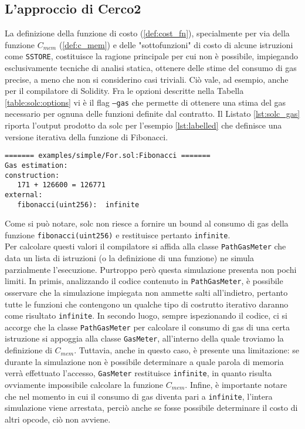 \documentclass[12pt,a4paper,openright,oneside]{report}
\theoremstyle{definition}
\begin{document}
\subsection{L'approccio di Cerco2}\label{impl:costs_calculation:cerco2_nonsolution}
La definizione della funzione di costo (\ref{def:cost_fn}), specialmente per via della funzione $C_{mem}$ (\ref{def:c_mem}) e delle "sottofunzioni" di costo di alcune istruzioni come \texttt{SSTORE}, costituisce la ragione principale per cui non \`{e} possibile, impiegando esclusivamente tecniche di analisi statica, ottenere delle stime del consumo di gas precise, a meno che non si considerino casi triviali. Ci\`{o} vale, ad esempio, anche per il compilatore di Solidity. Fra le opzioni descritte nella Tabella \ref{table:solc:options} vi \`{e} il flag \texttt{--gas} che permette di ottenere una stima del gas necessario per ognuna delle funzioni definite dal contratto. Il Listato \ref{lst:solc_gas} riporta l'output prodotto da solc per l'esempio \ref{lst:labelled} che definisce una versione iterativa della funzione di Fibonacci.\\
\begin{lstlisting}[caption={Output del flag \texttt{--gas} di solc} per la funzione di Fibonacci,label={lst:solc_gas},frame=tlrb]
======= examples/simple/For.sol:Fibonacci =======
Gas estimation:
construction:
   171 + 126600 = 126771
external:
   fibonacci(uint256):  infinite
\end{lstlisting}
Come si pu\`{o} notare, solc non riesce a fornire un bound al consumo di gas della funzione \texttt{fibonacci(uint256)} e restituisce pertanto \texttt{infinite}.\\
Per calcolare questi valori il compilatore si affida alla classe \texttt{PathGasMeter} che data un lista di istruzioni (o la definizione di una funzione) ne simula parzialmente l'esecuzione. Purtroppo per\`{o} questa simulazione presenta non pochi limiti. In primis, analizzando il codice contenuto in \texttt{PathGasMeter}, \`{e} possibile osservare che la simulazione impiegata non ammette salti all'indietro, pertanto tutte le funzioni che contengono un qualche tipo di costrutto iterativo daranno come risultato \texttt{infinite}. In secondo luogo, sempre ispezionando il codice, ci si accorge che la classe \texttt{PathGasMeter} per calcolare il consumo di gas di una certa istruzione si appoggia alla classe \texttt{GasMeter}, all'interno della quale troviamo la definizione di $C_{mem}$. Tuttavia, anche in questo caso, \`{e} presente una limitazione: se durante la simulazione non \`{e} possibile determinare a quale parola di memoria verr\`{a} effettuato l'accesso, \texttt{GasMeter} restituisce \texttt{infinite}, in quanto risulta ovviamente impossibile calcolare la funzione $C_{mem}$. Infine, \`{e} importante notare che nel momento in cui il consumo di gas diventa pari a \texttt{infinite}, l'intera simulazione viene arrestata, perci\`{o} anche se fosse possibile determinare il costo di altri opcode, ci\`{o} non avviene.\\
\end{document}
